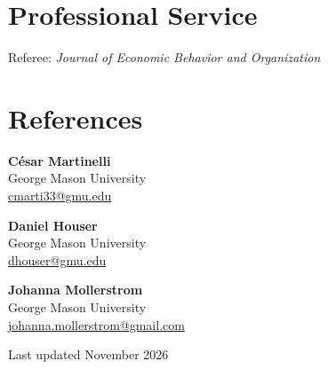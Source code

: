 \documentclass[11pt]{article}
\newcommand{\entry}[2]{#1\hfill#2\par}
\begin{document}
\section{Professional Service}
\entry{Referee: \emph{Journal of Economic Behavior and Organization}}{}

\section{References}
\begin{minipage}[t]{0.3\textwidth}
  \textbf{C\'esar Martinelli}\\
  George Mason University\\
  \href{mailto:cmarti33@gmu.edu}{cmarti33@gmu.edu}
\end{minipage}\hfill%
\begin{minipage}[t]{0.3\textwidth}
  \textbf{Daniel Houser}\\
  George Mason University\\
  \href{mailto:dhouser@gmu.edu}{dhouser@gmu.edu}
\end{minipage}\hfill%
\begin{minipage}[t]{0.36\textwidth}
  \textbf{Johanna Mollerstrom}\\
  George Mason University\\
  \href{mailto:johanna.mollerstrom@gmail.com}{johanna.mollerstrom@gmail.com}
\end{minipage}

\vfill
\begin{center}\small\color{gray}Last updated November 2026\end{center}
\end{document}
